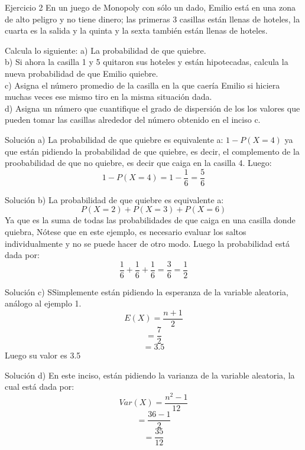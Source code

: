 \documentclass[11pt]{beamer}
\begin{document}
 \begin{frame}{Ejercicio 2}
En un juego de Monopoly con sólo un dado, Emilio está en una zona de alto peligro y
no tiene dinero; las primeras 3 casillas están llenas de hoteles, la cuarta es la salida y la
quinta y la sexta también están llenas de hoteles. 
\begin{block}{Calcula lo siguiente:}
a) La probabilidad de que quiebre.\\
b) Si ahora la casilla 1 y 5 quitaron sus hoteles y están hipotecadas, calcula la nueva
probabilidad de que Emilio quiebre.\\
c) Asigna el número promedio de la casilla en la que caería Emilio si hiciera muchas veces
ese mismo tiro en la misma situación dada.\\
d) Asigna un número que cuantifique el grado de dispersión de los los valores que pueden
tomar las casillas alrededor del número obtenido en el inciso c.
\end{block}
 \end{frame}
 \begin{frame}{Solución a)}
 La probabilidad de que quiebre es equivalente a:
$1  - P(X = 4)$ ya que están pidiendo la probabilidad de que quiebre, es decir, el complemento
de la proobabilidad de que no quiebre, es decir que caiga en la casilla 4.
Luego:
$$1 - P(X = 4) = 1 - \dfrac{1}{6} = \dfrac{5}{6}$$
\end{frame}
\begin{frame}{Solución b)}
La probabilidad de que quiebre es equivalente a:
$$P(X = 2) + P(X = 3) + P(X = 6)$$
Ya que es la suma de todas las probabilidades de
que caiga en una casilla donde quiebra, Nótese que en este ejemplo, es necesario evaluar
los saltos individualmente y no se puede hacer de otro modo. Luego la probabilidad está
dada por: 
$$\dfrac{1}{6} + \dfrac{1}{6} + \dfrac{1}{6} = \dfrac{3}{6} = \dfrac{1}{2}$$ 
\end{frame}
\begin{frame}{Solución c)}
SSimplemente están pidiendo la esperanza de la variable aleatoria, análogo al ejemplo 1. 
$$E(X)=\dfrac{n + 1}{2}$$
$$=\dfrac{7}{2}$$
$$=3.5$$
Luego su valor es 3.5
\end{frame}
\begin{frame}{Solución d)}
En este inciso, están pidiendo la varianza de la variable aleatoria, la cual está dada por:
 $$Var(X)=\dfrac{n^{2}-1}{12}$$
$$= \dfrac{36 - 1}{2}$$
$$=\dfrac{35}{12}$$
 \end{frame}
\end{document}
